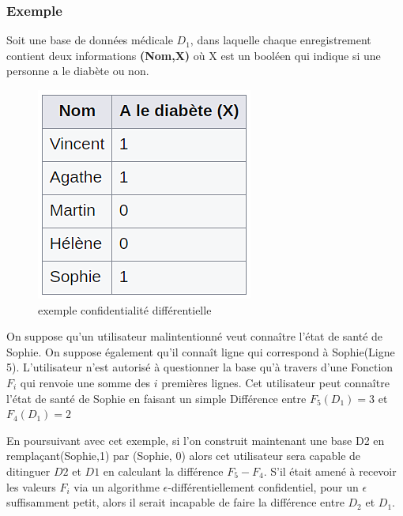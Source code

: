\subsubsection{Exemple}
Soit une base de données médicale \begin{math}D_{1}\end{math}, dans laquelle chaque enregistrement contient deux informations \textbf{(Nom,X)} où X est un booléen qui indique si une personne a le diabète ou non.
\begin{figure}[!h]
    \centering
    \includegraphics[width=.3\textwidth]{images/anonymisation/confidentialite_diff.png}
    \caption{ exemple confidentialité différentielle}
    \label{fig:exemple confidentialité différentiellel}
\end{figure}
On suppose qu'un utilisateur malintentionné veut connaître l'état de santé de Sophie. On suppose également qu'il connaît ligne qui correspond à Sophie(Ligne 5). L'utilisateur n'est autorisé à questionner la base qu'à travers d'une Fonction \begin{math}F_{i}\end{math} qui renvoie une somme des \begin{math}i\end{math} premières lignes. Cet utilisateur peut connaître l'état de santé de Sophie en faisant un simple Différence entre \begin{math}F_{5}(D_{1}) = 3\end{math} et \begin{math}F_{4}(D_{1}) = 2\end{math}

En poursuivant avec cet exemple, si l'on construit maintenant une base D2 en remplaçant(Sophie,1) par (Sophie, 0) alors cet utilisateur sera capable de ditinguer \begin{math}D2\end{math} et \begin{math}D1\end{math} en calculant la différence \begin{math}F_{5} - F_{4}\end{math}. S'il était amené à recevoir les valeurs \begin{math}F_{i}\end{math} via un algorithme \begin{math}\epsilon\end{math}-différentiellement confidentiel, pour un \begin{math}\epsilon\end{math} suffisamment petit, alors il serait incapable de faire la différence entre \begin{math}D_{2}\end{math} et \begin{math}D_{1}\end{math}.

